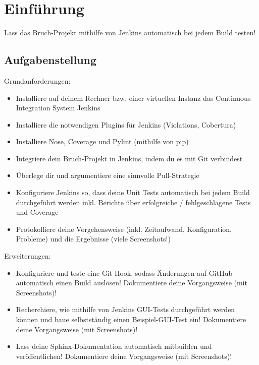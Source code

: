 
\section{Einführung}
Lass das Bruch-Projekt mithilfe von Jenkins automatisch bei jedem Build testen!

\subsection{Aufgabenstellung}
Grundanforderungen:

\begin{itemize}
	\item Installiere auf deinem Rechner bzw. einer virtuellen Instanz das Continuous Integration System Jenkins
	\item Installiere die notwendigen Plugins für Jenkins (Violations, Cobertura)
	\item Installiere Nose, Coverage und Pylint (mithilfe von pip)
	\item Integriere dein Bruch-Projekt in Jenkins, indem du es mit Git verbindest
	\item Überlege dir und argumentiere eine sinnvolle Pull-Strategie
	\item Konfiguriere Jenkins so, dass deine Unit Tests automatisch bei jedem Build durchgeführt werden inkl. Berichte über erfolgreiche / fehlgeschlagene Tests und Coverage
	\item Protokolliere deine Vorgehensweise (inkl. Zeitaufwand, Konfiguration, Probleme) und die Ergebnisse (viele Screenshots!)
\end{itemize}

Erweiterungen:

\begin{itemize}
	\item Konfiguriere und teste eine Git-Hook, sodass Änderungen auf GitHub automatisch einen Build auslösen! Dokumentiere deine Vorgangsweise (mit Screenshots)!
	\item Recherchiere, wie mithilfe von Jenkins GUI-Tests durchgeführt werden können und baue selbstständig einen Beispiel-GUI-Test ein! Dokumentiere deine Vorgangsweise (mit Screenshots)!
	\item Lass deine Sphinx-Dokumentation automatisch mitbuilden und veröffentlichen! Dokumentiere deine Vorgangsweise (mit Screenshots)!
\end{itemize}


\clearpage
